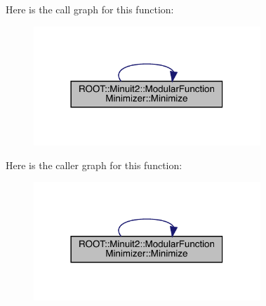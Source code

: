 Here is the call graph for this function\+:
\nopagebreak
\begin{figure}[H]
\begin{center}
\leavevmode
\includegraphics[width=242pt]{d3/dc8/classROOT_1_1Minuit2_1_1ModularFunctionMinimizer_a83b8641b6e3662f763c79c3fcb014838_cgraph}
\end{center}
\end{figure}
Here is the caller graph for this function\+:
\nopagebreak
\begin{figure}[H]
\begin{center}
\leavevmode
\includegraphics[width=242pt]{d3/dc8/classROOT_1_1Minuit2_1_1ModularFunctionMinimizer_a83b8641b6e3662f763c79c3fcb014838_icgraph}
\end{center}
\end{figure}
\mbox{\label{classROOT_1_1Minuit2_1_1ModularFunctionMinimizer_ab9a4f3d9f93071d0363ad838c103690d}} 
